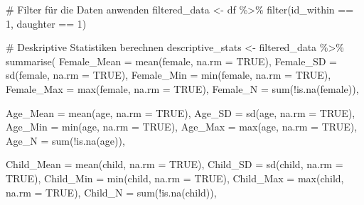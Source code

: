 \documentclass[
  letterpaper,
  DIV=11,
  numbers=noendperiod]{scrartcl}
\newenvironment{Shaded}{\begin{snugshade}}{\end{snugshade}}
\newcommand{\AttributeTok}[1]{\textcolor[rgb]{0.40,0.45,0.13}{#1}}
\newcommand{\CommentTok}[1]{\textcolor[rgb]{0.37,0.37,0.37}{#1}}
\newcommand{\ConstantTok}[1]{\textcolor[rgb]{0.56,0.35,0.01}{#1}}
\newcommand{\DecValTok}[1]{\textcolor[rgb]{0.68,0.00,0.00}{#1}}
\newcommand{\FunctionTok}[1]{\textcolor[rgb]{0.28,0.35,0.67}{#1}}
\newcommand{\NormalTok}[1]{\textcolor[rgb]{0.00,0.23,0.31}{#1}}
\newcommand{\OtherTok}[1]{\textcolor[rgb]{0.00,0.23,0.31}{#1}}
\newcommand{\SpecialCharTok}[1]{\textcolor[rgb]{0.37,0.37,0.37}{#1}}
\begin{document}
\begin{Shaded}
\begin{Highlighting}[]
\CommentTok{\# Filter für die Daten anwenden}
\NormalTok{filtered\_data }\OtherTok{\textless{}{-}}\NormalTok{ df }\SpecialCharTok{\%\textgreater{}\%}
  \FunctionTok{filter}\NormalTok{(id\_within }\SpecialCharTok{==} \DecValTok{1}\NormalTok{, daughter }\SpecialCharTok{==} \DecValTok{1}\NormalTok{)}

\CommentTok{\# Deskriptive Statistiken berechnen}
\NormalTok{descriptive\_stats }\OtherTok{\textless{}{-}}\NormalTok{ filtered\_data }\SpecialCharTok{\%\textgreater{}\%}
  \FunctionTok{summarise}\NormalTok{(}
    \AttributeTok{Female\_Mean =} \FunctionTok{mean}\NormalTok{(female, }\AttributeTok{na.rm =} \ConstantTok{TRUE}\NormalTok{),}
    \AttributeTok{Female\_SD =} \FunctionTok{sd}\NormalTok{(female, }\AttributeTok{na.rm =} \ConstantTok{TRUE}\NormalTok{),}
    \AttributeTok{Female\_Min =} \FunctionTok{min}\NormalTok{(female, }\AttributeTok{na.rm =} \ConstantTok{TRUE}\NormalTok{),}
    \AttributeTok{Female\_Max =} \FunctionTok{max}\NormalTok{(female, }\AttributeTok{na.rm =} \ConstantTok{TRUE}\NormalTok{),}
    \AttributeTok{Female\_N =} \FunctionTok{sum}\NormalTok{(}\SpecialCharTok{!}\FunctionTok{is.na}\NormalTok{(female)),}
    
    \AttributeTok{Age\_Mean =} \FunctionTok{mean}\NormalTok{(age, }\AttributeTok{na.rm =} \ConstantTok{TRUE}\NormalTok{),}
    \AttributeTok{Age\_SD =} \FunctionTok{sd}\NormalTok{(age, }\AttributeTok{na.rm =} \ConstantTok{TRUE}\NormalTok{),}
    \AttributeTok{Age\_Min =} \FunctionTok{min}\NormalTok{(age, }\AttributeTok{na.rm =} \ConstantTok{TRUE}\NormalTok{),}
    \AttributeTok{Age\_Max =} \FunctionTok{max}\NormalTok{(age, }\AttributeTok{na.rm =} \ConstantTok{TRUE}\NormalTok{),}
    \AttributeTok{Age\_N =} \FunctionTok{sum}\NormalTok{(}\SpecialCharTok{!}\FunctionTok{is.na}\NormalTok{(age)),}
    
    \AttributeTok{Child\_Mean =} \FunctionTok{mean}\NormalTok{(child, }\AttributeTok{na.rm =} \ConstantTok{TRUE}\NormalTok{),}
    \AttributeTok{Child\_SD =} \FunctionTok{sd}\NormalTok{(child, }\AttributeTok{na.rm =} \ConstantTok{TRUE}\NormalTok{),}
    \AttributeTok{Child\_Min =} \FunctionTok{min}\NormalTok{(child, }\AttributeTok{na.rm =} \ConstantTok{TRUE}\NormalTok{),}
    \AttributeTok{Child\_Max =} \FunctionTok{max}\NormalTok{(child, }\AttributeTok{na.rm =} \ConstantTok{TRUE}\NormalTok{),}
    \AttributeTok{Child\_N =} \FunctionTok{sum}\NormalTok{(}\SpecialCharTok{!}\FunctionTok{is.na}\NormalTok{(child)),}
    

\end{Highlighting}
\end{Shaded}
\end{document}
